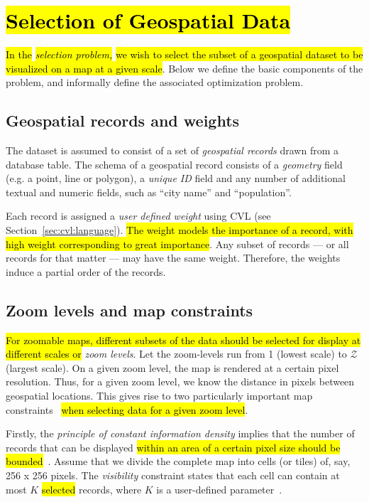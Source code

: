 \section{\hl{Selection of Geospatial Data}}
\label{sec:background}

\hl{In the }\emph{\hl{selection problem,}}\hl{ we wish to select the subset of a geospatial dataset to be visualized on a map at a given scale}. Below we define the basic components of the problem, and informally define the associated optimization problem.

\subsection{Geospatial records and weights}
\label{sec:records}

The dataset is assumed to consist of a set of \emph{geospatial records} drawn from a database table. The schema of a geospatial record consists of a \emph{geometry} field (e.g. a point, line or polygon), a \emph{unique ID} field and any number of additional textual and numeric fields, such as ``city name'' and ``population''.

Each record is assigned a \emph{user defined weight} using CVL (see Section~\ref{sec:cvl:language}). \hl{The weight models the importance of a record, with high weight corresponding to great importance}. Any subset of records --- or all records for that matter --- may have the same weight. Therefore, the weights induce a partial order of the records.

\subsection{Zoom levels and map constraints}
\label{sec:constraints}
\hl{For zoomable maps, different subsets of the data should be selected for display at different scales or }\emph{zoom levels}. Let the zoom-levels run from 1 (lowest scale) to $\mathcal{Z}$ (largest scale). On a given zoom level, the map is rendered at a certain pixel resolution. Thus, for a given zoom level, we know the distance in pixels between geospatial locations. This gives rise to two particularly important map constraints~\cite{harrie2007modelling} \hl{when selecting data for a given zoom level}.

Firstly, the \emph{principle of constant information density} implies that the number of records that can be displayed \hl{within an area of a certain pixel size should be bounded}~\cite{topfer1966principles}. Assume that we divide the complete map into cells (or tiles) of, say, 256 x 256 pixels. The \emph{visibility} constraint states that each cell can contain at most $K$ \hl{selected} records, where $K$ is a user-defined parameter~\cite{sarma2012fusiontables}.

